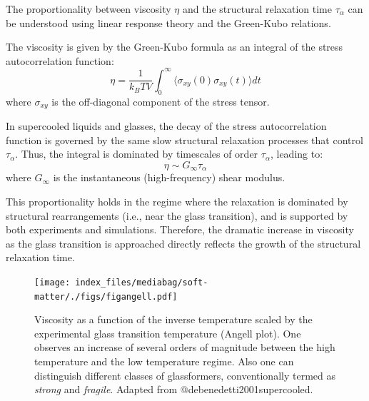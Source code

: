 \documentclass[
  letterpaper,
  enabledeprecatedfontcommands]{report}
\begin{document}
\begin{tcolorbox}[enhanced jigsaw, toprule=.15mm, opacityback=0, colbacktitle=quarto-callout-note-color!10!white, title=\textcolor{quarto-callout-note-color}{\faInfo}\hspace{0.5em}{Relationship between viscosity and structural relaxation time}, leftrule=.75mm, rightrule=.15mm, bottomtitle=1mm, breakable, colframe=quarto-callout-note-color-frame, colback=white, toptitle=1mm, left=2mm, titlerule=0mm, coltitle=black, arc=.35mm, bottomrule=.15mm, opacitybacktitle=0.6]

The proportionality between viscosity \(\eta\) and the structural
relaxation time \(\tau_\alpha\) can be understood using linear response
theory and the Green-Kubo relations.

The viscosity is given by the Green-Kubo formula as an integral of the
stress autocorrelation function: \[
\eta = \frac{1}{k_B T V} \int_0^\infty \langle \sigma_{xy}(0) \sigma_{xy}(t) \rangle dt
\] where \(\sigma_{xy}\) is the off-diagonal component of the stress
tensor.

In supercooled liquids and glasses, the decay of the stress
autocorrelation function is governed by the same slow structural
relaxation processes that control \(\tau_\alpha\). Thus, the integral is
dominated by timescales of order \(\tau_\alpha\), leading to: \[
\eta \sim G_\infty \tau_\alpha
\] where \(G_\infty\) is the instantaneous (high-frequency) shear
modulus.

This proportionality holds in the regime where the relaxation is
dominated by structural rearrangements (i.e., near the glass
transition), and is supported by both experiments and simulations.
Therefore, the dramatic increase in viscosity as the glass transition is
approached directly reflects the growth of the structural relaxation
time.

\end{tcolorbox}

\begin{figure}[H]

{\centering \texttt{[image: index\_files/mediabag/soft-matter/./figs/figangell.pdf]}

}

\caption{Viscosity as a function of the inverse temperature scaled by
the experimental glass transition temperature (Angell plot). One
observes an increase of several orders of magnitude between the high
temperature and the low temperature regime. Also one can distinguish
different classes of glassformers, conventionally termed as
\emph{strong} and \emph{fragile}. Adapted from
@debenedetti2001supercooled.}

\end{figure}%
\end{document}
